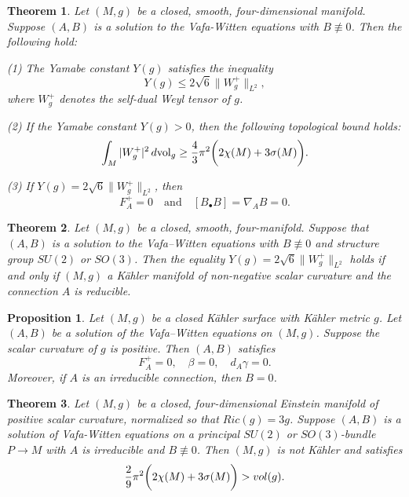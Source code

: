 \documentclass[10pt,a4paper]{amsart}
\newtheorem{theorem}{Theorem}
\newtheorem{proposition}{Proposition}
\def \b {\beta}
\begin{document}
\begin{theorem}\label{T1}
Let $(M,g)$ be a closed, smooth, four-dimensional manifold. Suppose $(A,B)$ is a solution to the Vafa-Witten equations with $B\not\equiv0$. 
Then the following hold:

\noindent\textup{(1)} The Yamabe constant $Y(g)$ satisfies the inequality
\begin{equation} \label{E0}
Y(g)\leq 2\sqrt{6}\|W^{+}_{g}\|_{L^{2}},
\end{equation}
where $W^{+}_{g}$ denotes the self-dual Weyl tensor of $g$.

\noindent\textup{(2)} If the Yamabe constant $Y(g)>0$, then the following topological bound holds:
\begin{equation}\label{E10}
\int_{M}|W^{+}_{g}|^{2}\,d\mathrm{vol}_{g}\geq\frac{4}{3}\pi^{2}\bigg{(}2\chi(M)+3\sigma(M)\bigg{)}.
\end{equation}

\noindent\textup{(3)} If $Y(g)=2\sqrt{6}\|W^{+}_{g}\|_{L^{2}}$, then 
\[
F_{A}^{+}=0\quad\text{and}\quad [B_{\bullet}B]=\nabla_{A}B=0.
\]
\end{theorem}

\begin{theorem}\label{T2}
Let $(M,g)$ be a closed, smooth, four-manifold. Suppose that $(A,B)$ is a solution to the Vafa--Witten equations with $B\not\equiv0$ and structure group $SU(2)$ or $SO(3)$. Then the equality $Y(g)=2\sqrt{6}\|W^{+}_{g}\|_{L^{2}}$ holds if and only if $(M,g)$ a K\"{a}hler manifold of non-negative scalar curvature and the connection $A$ is reducible.
\end{theorem}

\begin{proposition}\label{P5}
	Let $(M,g)$ be a closed K\"{a}hler surface with K\"{a}hler metric $g$. Let $(A,B)$ be a solution of the Vafa--Witten equations on $(M,g)$.
	 Suppose the scalar curvature of $g$ is positive. Then $(A,B)$ satisfies 
	$$F_{A}^{+}=0,\quad \b=0,\quad d_{A}\gamma=0.$$
	Moreover, if $A$ is an irreducible connection, then $B=0$. 
\end{proposition}

\begin{theorem}\label{T3}
Let $(M,g)$ be a closed, four-dimensional Einstein manifold of positive scalar curvature, normalized so that $Ric(g)=3g$. Suppose $(A,B)$ is a solution of Vafa-Witten equations on a principal $SU(2)$ or $SO(3)$-bundle $P\rightarrow M$ with $A$ is irreducible and $B\not\equiv0$. 
Then $(M,g)$ is not K\"{a}hler and satisfies \[\frac{2}{9}\pi^{2}\bigg{(}2\chi(M)+3\sigma(M)\bigg{)}>vol(g). \]
\end{theorem}
\end{document}
